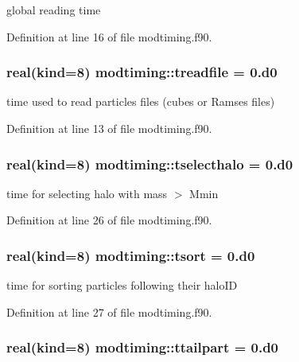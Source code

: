 global reading time 



Definition at line 16 of file modtiming.\-f90.

\hypertarget{classmodtiming_ab585192644ed79fc1030fde80dd84f85}{
\subsubsection[{treadfile}]{\setlength{\rightskip}{0pt plus 5cm}real(kind=8) modtiming\-::treadfile = 0.d0}}\label{classmodtiming_ab585192644ed79fc1030fde80dd84f85}


time used to read particles files (cubes or Ramses files) 



Definition at line 13 of file modtiming.\-f90.

\hypertarget{classmodtiming_a0e46279061d4681c9c8b5a055410f04b}{
\subsubsection[{tselecthalo}]{\setlength{\rightskip}{0pt plus 5cm}real(kind=8) modtiming\-::tselecthalo = 0.d0}}\label{classmodtiming_a0e46279061d4681c9c8b5a055410f04b}


time for selecting halo with mass $>$ Mmin 



Definition at line 26 of file modtiming.\-f90.

\hypertarget{classmodtiming_a32142e111b00eb8590746eef1b1d9dd6}{
\subsubsection[{tsort}]{\setlength{\rightskip}{0pt plus 5cm}real(kind=8) modtiming\-::tsort = 0.d0}}\label{classmodtiming_a32142e111b00eb8590746eef1b1d9dd6}


time for sorting particles following their halo\-I\-D 



Definition at line 27 of file modtiming.\-f90.

\hypertarget{classmodtiming_a65a8925f0685c0a5c5e42b0afd3b4a69}{
\subsubsection[{ttailpart}]{\setlength{\rightskip}{0pt plus 5cm}real(kind=8) modtiming\-::ttailpart = 0.d0}}\label{classmodtiming_a65a8925f0685c0a5c5e42b0afd3b4a69}


